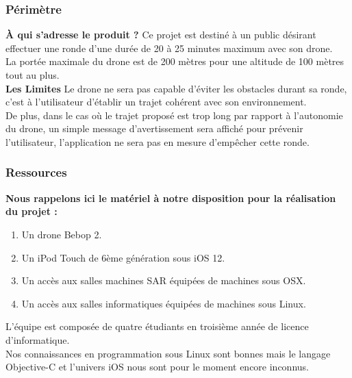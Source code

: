 \documentclass{article}
\begin{document}
    \subsubsection{Périmètre}
    \textbf{À qui s'adresse le produit ?}
    \newline
	Ce projet est destiné à un public désirant effectuer une ronde d'une durée de 20 à 25 minutes maximum avec son drone.\\
		La portée maximale du drone est de 200 mètres pour une altitude de 100 mètres tout au plus.\\
	\newline
	\textbf{Les Limites}
	\newline
		Le drone ne sera pas capable d'éviter les obstacles durant sa ronde, c'est à l'utilisateur d'établir un trajet cohérent avec son environnement.\\
		De plus, dans le cas où le trajet proposé est trop long par rapport à l'autonomie du drone, un simple message d'avertissement sera affiché pour prévenir l'utilisateur, l'application ne sera pas en mesure d'empêcher cette ronde.
	

    
    \subsubsection{Ressources}
    \textbf{Nous rappelons ici le matériel à notre disposition pour la réalisation du projet :}

	\begin{enumerate}
        \item Un drone Bebop 2.
        \item Un iPod Touch de 6ème génération sous iOS 12.
        \item Un accès aux salles machines SAR équipées de machines sous OSX.
        \item Un accès aux salles informatiques équipées de machines sous Linux.
    \end{enumerate}
    \vspace{0.1cm}
        L'équipe est composée de quatre étudiants en troisième année de licence d'informatique.\\
        Nos connaissances en programmation sous Linux sont bonnes mais le langage Objective-C et l'univers iOS nous sont pour le moment encore inconnus.
        
\end{document}
